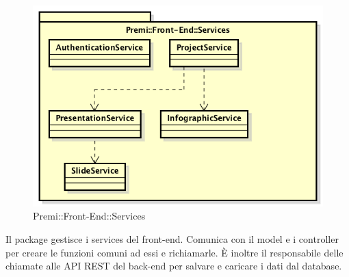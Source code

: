 \begin{figure}[h]
	\centering
	\includegraphics[width=0.7\linewidth]{img/premi_front_end_services}
	\caption[Premi::Front-End::Services]{Premi::Front-End::Services}
\end{figure}
Il package gestisce i services del front-end. Comunica con il model e i controller per creare le funzioni comuni ad essi e richiamarle. È inoltre il responsabile delle chiamate alle API REST del back-end per salvare e caricare i dati dal database.